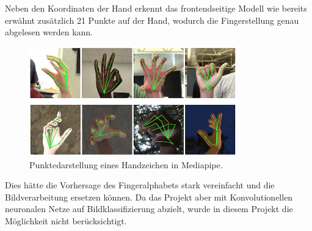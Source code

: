 \documentclass[11pt,bibliography=totocnumbered]{scrartcl}
\begin{document}
\\\\
Neben den Koordinaten der Hand erkennt das frontendseitige Modell wie bereits erwähnt zusätzlich 21 Punkte auf der Hand, wodurch die Fingerstellung genau abgelesen werden kann.
\begin{figure}[H]
	\centering
	\includegraphics[width=0.80\textwidth]{mediapipe_finger}
	\vspace*{-3mm}
	\caption[Punktedarstellung eines Handzeichen in Mediapipe]{Punktedarstellung eines Handzeichen in Mediapipe.}
	\label{fig:mediapipe_finger}
\end{figure}
Dies hätte die Vorhersage des Fingeralphabets stark vereinfacht und die Bildverarbeitung ersetzen können. Da das Projekt aber mit Konvolutionellen neuronalen Netze auf Bildklassifizierung abzielt, wurde in diesem Projekt die Möglichkeit nicht berücksichtigt.
\end{document}
